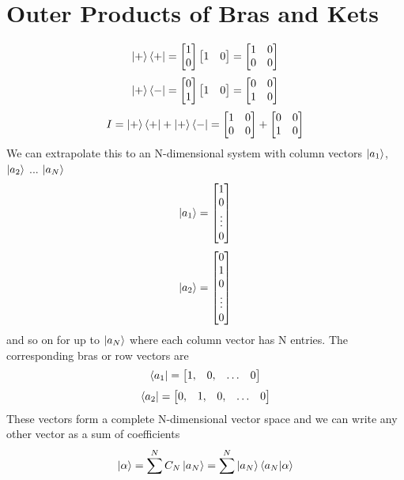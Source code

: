 \documentclass{book}
\begin{document}
\section{Outer Products of Bras and Kets}
$$\ket{+} \bra{+} = \begin{bmatrix} 1 \\ 0 \end{bmatrix}  \begin{bmatrix} 1 & 0 \end{bmatrix} = \begin{bmatrix} 1 & 0 \\ 0 & 0 \end{bmatrix}$$
$$\ket{+} \bra{-} = \begin{bmatrix} 0 \\ 1 \end{bmatrix}  \begin{bmatrix} 1 & 0 \end{bmatrix} = \begin{bmatrix} 0 & 0 \\ 1 & 0 \end{bmatrix}$$
$$ I = \ket{+} \bra{+} + \ket{+} \bra{-} = \begin{bmatrix} 1 & 0 \\ 0 & 0 \end{bmatrix} + \begin{bmatrix} 0 & 0 \\ 1 & 0 \end{bmatrix} $$
We can extrapolate this to an N-dimensional system with column vectors $\ket{a_1}$, $\ket{a_2}$ ... $\ket{a_N}$
$$\ket{a_1} = \begin{bmatrix} 1 \\ 0 \\ \vdots \\ 0 \end{bmatrix}$$
$$\ket{a_2} = \begin{bmatrix} 0 \\ 1 \\ 0 \\ \vdots \\ 0 \end{bmatrix}$$
and so on for up to $\ket{a_N}$ where each column vector has N entries. The corresponding bras or row vectors are
$$\bra{a_1} = \begin{bmatrix} 1, & 0, & \hdots & 0 \end{bmatrix}$$
$$\bra{a_2} = \begin{bmatrix} 0, & 1, & 0, & \hdots & 0 \end{bmatrix}$$
These vectors form a complete N-dimensional vector space and we can write any other vector as a sum of coefficients 
$$ \ket{\alpha} = \sum^N C_N\ket{a_N} = \sum^N \ket{a_N} \bra{a_N} \ket{\alpha} $$
\end{document}
